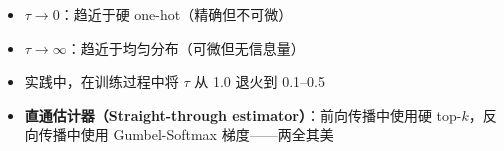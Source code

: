 \begin{itemize}
  \item $\tau \to 0$：趋近于硬 one-hot（精确但不可微）
  \item $\tau \to \infty$：趋近于均匀分布（可微但无信息量）
  \item 实践中，在训练过程中将 $\tau$ 从 1.0 退火到 0.1--0.5
  \item \textbf{直通估计器（Straight-through estimator）}：前向传播中使用硬 top-$k$，反向传播中使用 Gumbel-Softmax 梯度——两全其美
\end{itemize}

